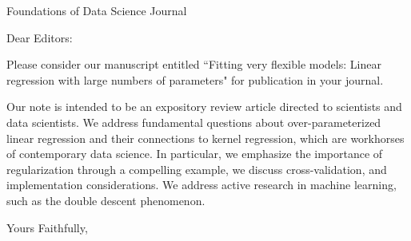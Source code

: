 \documentclass{letter}
\begin{document}
\begin{letter}{Foundations of Data Science Journal}
\opening{Dear Editors:}

Please consider our manuscript entitled ``Fitting very flexible models: Linear regression with large numbers of parameters" for publication in your journal. 

Our note is intended to be an expository review article directed to scientists and data scientists. We address fundamental questions about over-parameterized linear regression and their connections to kernel regression, which are workhorses of contemporary data science. In particular, we emphasize the importance of regularization through a compelling example, we discuss cross-validation, and implementation considerations. We address active research in machine learning, such as the double descent phenomenon. 




\closing{Yours Faithfully,}




\end{letter}
\end{document}
